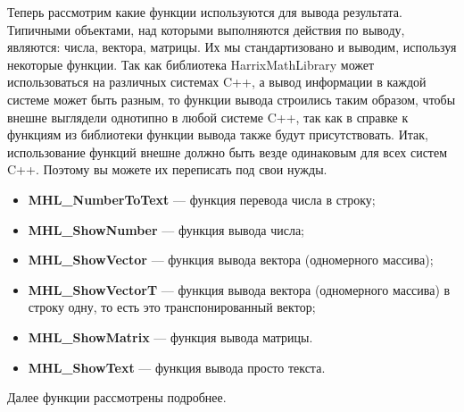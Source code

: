\documentclass[a4paper,12pt]{article}
\begin{document}
Теперь рассмотрим какие функции используются для вывода результата. Типичными объектами, над которыми выполняются действия по выводу, являются: числа, вектора, матрицы. Их мы стандартизовано и выводим, используя некоторые функции. Так как библиотека HarrixMathLibrary может использоваться на различных системах C++, а вывод информации в каждой системе может быть разным, то функции вывода строились таким образом, чтобы внешне выглядели однотипно в любой системе C++, так как в справке к функциям из библиотеки функции вывода также будут присутствовать. Итак, использование функций внешне должно быть везде одинаковым для всех систем C++.  Поэтому вы можете их переписать под свои нужды.


\begin{itemize}
\item \textbf{MHL\_NumberToText} --- функция перевода числа в строку; 
\item \textbf{MHL\_ShowNumber} --- функция вывода числа;
\item \textbf{MHL\_ShowVector} --- функция вывода вектора (одномерного массива);
\item \textbf{MHL\_ShowVectorT} --- функция вывода вектора (одномерного массива) в строку одну, то есть это транспонированный вектор;
\item \textbf{MHL\_ShowMatrix} --- функция вывода матрицы.
\item \textbf{MHL\_ShowText} --- функция вывода просто текста.
\end{itemize}

Далее функции рассмотрены подробнее.
\end{document}
